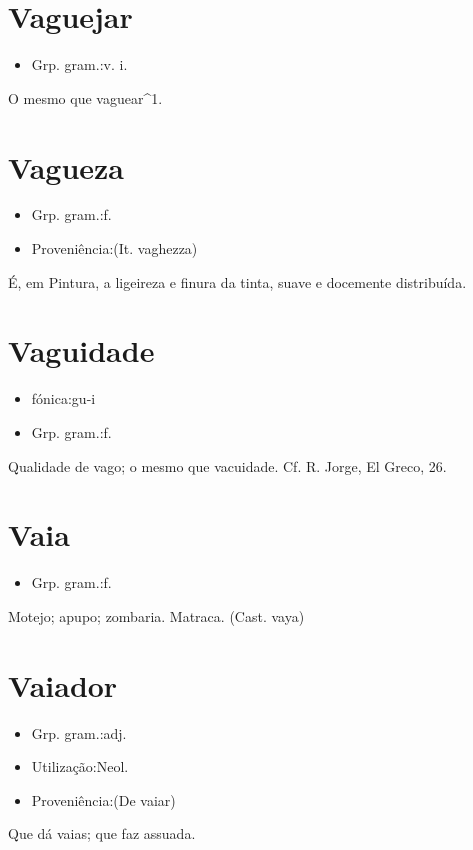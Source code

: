 \documentclass{article}
\begin{document}
\section{Vaguejar}
\begin{itemize}
\item {Grp. gram.:v. i.}
\end{itemize}
O mesmo que \textunderscore vaguear\textunderscore ^1.
\section{Vagueza}
\begin{itemize}
\item {Grp. gram.:f.}
\end{itemize}
\begin{itemize}
\item {Proveniência:(It. \textunderscore vaghezza\textunderscore )}
\end{itemize}
É, em Pintura, a ligeireza e finura da tinta, suave e docemente distribuída.
\section{Vaguidade}
\begin{itemize}
\item {fónica:gu-i}
\end{itemize}
\begin{itemize}
\item {Grp. gram.:f.}
\end{itemize}
Qualidade de vago; o mesmo que \textunderscore vacuidade\textunderscore . Cf. R. Jorge, \textunderscore El Greco\textunderscore , 26.
\section{Vaia}
\begin{itemize}
\item {Grp. gram.:f.}
\end{itemize}
Motejo; apupo; zombaria.
Matraca.
(Cast. \textunderscore vaya\textunderscore )
\section{Vaiador}
\begin{itemize}
\item {Grp. gram.:adj.}
\end{itemize}
\begin{itemize}
\item {Utilização:Neol.}
\end{itemize}
\begin{itemize}
\item {Proveniência:(De \textunderscore vaiar\textunderscore )}
\end{itemize}
Que dá vaias; que faz assuada.
\end{document}
